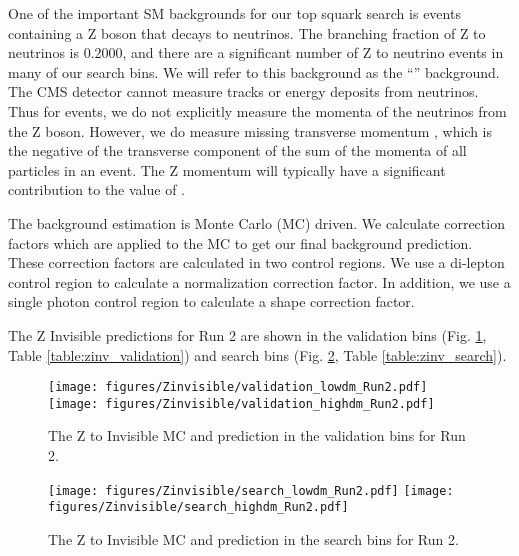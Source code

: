 
One of the important SM backgrounds for our top squark search is events containing a Z boson that decays to neutrinos.
The branching fraction of Z to neutrinos is 0.2000, and there are a significant number of Z to neutrino events in many of our search bins.
We will refer to this background as the ``\zinv'' background.
The CMS detector cannot measure tracks or energy deposits from neutrinos.
Thus for \zinv events, we do not explicitly measure the momenta of the neutrinos from the Z boson.
However, we do measure missing transverse momentum \ptmiss, which is the negative of the transverse component of the sum of the momenta of all particles in an event.
The Z momentum will typically have a significant contribution to the value of \ptmiss.

The \zinv background estimation is Monte Carlo (MC) driven.
We calculate correction factors which are applied to the \zinv MC to get our final background prediction.
These correction factors are calculated in two control regions.
We use a di-lepton control region to calculate a normalization correction factor.
In addition, we use a single photon control region to calculate a shape correction factor.

The Z Invisible predictions for Run 2 are shown in the validation bins (Fig. \ref{fig:zinv_validation}, Table \ref{table:zinv_validation}) and search bins (Fig. \ref{fig:zinv_search}, Table \ref{table:zinv_search}).

\begin{figure}
{
\centering
\texttt{[image: figures/Zinvisible/validation\_lowdm\_Run2.pdf]}
\texttt{[image: figures/Zinvisible/validation\_highdm\_Run2.pdf]}
\caption{The Z to Invisible MC and prediction in the validation bins for Run 2.}
\label{fig:zinv_validation}
}
\end{figure}

\begin{figure}
{
\centering
\texttt{[image: figures/Zinvisible/search\_lowdm\_Run2.pdf]}
\texttt{[image: figures/Zinvisible/search\_highdm\_Run2.pdf]}
\caption{The Z to Invisible MC and prediction in the search bins for Run 2.}
\label{fig:zinv_search}
}
\end{figure}


